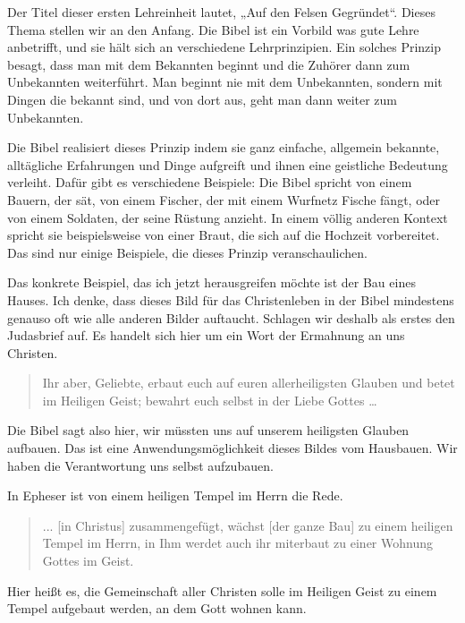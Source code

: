 Der Titel dieser ersten Lehreinheit lautet, „Auf den Felsen Gegründet“. Dieses Thema stellen wir an den Anfang. Die Bibel ist ein Vorbild was gute Lehre anbetrifft, und sie hält sich an verschiedene Lehrprinzipien. Ein solches Prinzip besagt, dass man mit dem Bekannten beginnt und die Zuhörer dann zum Unbekannten weiterführt. Man beginnt nie mit dem Unbekannten, sondern mit Dingen die bekannt sind, und von dort aus, geht man dann weiter zum Unbekannten.

Die Bibel realisiert dieses Prinzip indem sie ganz einfache, allgemein bekannte, alltägliche Erfahrungen und Dinge aufgreift und ihnen eine geistliche Bedeutung verleiht. 
Dafür gibt es verschiedene Beispiele: Die Bibel spricht von einem Bauern, der sät, von einem Fischer, der mit einem Wurfnetz Fische fängt, oder von einem Soldaten, der seine Rüstung anzieht. 
In einem völlig anderen Kontext spricht sie beispielsweise von einer Braut, die sich auf die Hochzeit vorbereitet. 
Das sind nur einige Beispiele, die dieses Prinzip veranschaulichen.

Das konkrete Beispiel, das ich jetzt herausgreifen möchte ist der Bau eines Hauses. 
Ich denke, dass dieses Bild für das Christenleben in der Bibel mindestens genauso oft wie alle anderen Bilder auftaucht. 
Schlagen wir deshalb als erstes den Judasbrief auf.
Es handelt sich hier um ein Wort der Ermahnung an uns Christen.

\begin{quotation}
  Ihr aber, Geliebte, erbaut euch auf euren allerheiligsten Glauben und betet im Heiligen Geist; bewahrt euch selbst in der Liebe Gottes … 
\end{quotation}

Die Bibel sagt also hier, wir müssten uns auf unserem heiligsten Glauben aufbauen.
Das ist eine Anwendungsmöglichkeit dieses Bildes vom Hausbauen. 
Wir haben die Verantwortung uns selbst aufzubauen.

In Epheser ist von einem heiligen Tempel im Herrn die Rede.

\begin{quotation}
  ... [in Christus] zusammengefügt, wächst [der ganze Bau] zu einem heiligen Tempel im Herrn, in Ihm werdet auch ihr miterbaut zu einer Wohnung Gottes im Geist. 
\end{quotation}

Hier heißt es, die Gemeinschaft aller Christen solle im Heiligen Geist zu einem Tempel aufgebaut werden, an dem Gott wohnen kann.

